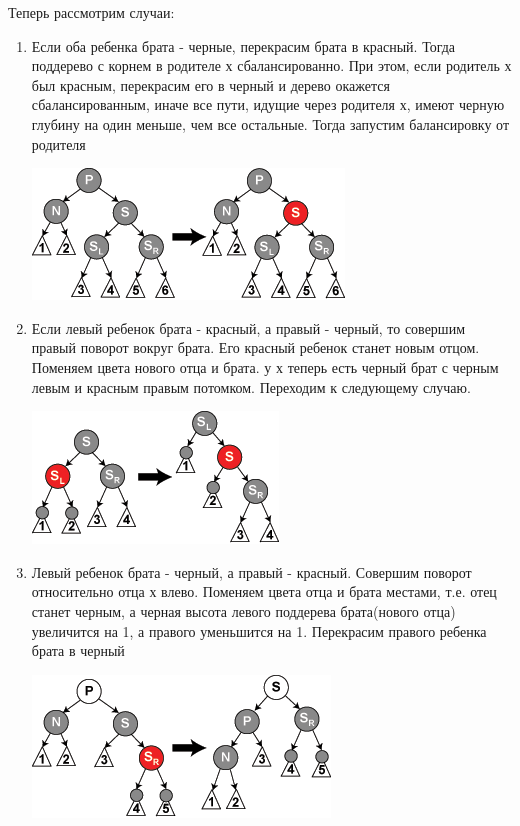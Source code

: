 \documentclass[a4paper,10pt]{article}
\begin{document}
Теперь рассмотрим случаи:
\begin{enumerate}
	\item Если оба ребенка брата - черные, перекрасим брата в красный. Тогда поддерево с корнем в родителе х сбалансированно. При этом, если родитель х был красным, перекрасим его в черный и дерево окажется сбалансированным, иначе все пути, идущие через родителя х, имеют черную глубину на один меньше, чем все остальные. Тогда запустим балансировку от родителя\\
\begin{center}\includegraphics{rbt_del_2.png}\end{center}
	\item Если левый ребенок брата - красный, а правый - черный, то совершим правый поворот вокруг брата. Его красный ребенок станет новым отцом. Поменяем цвета нового отца и брата. у х теперь есть черный брат с черным левым и красным правым потомком. Переходим к следующему случаю.\\
\begin{center}\includegraphics{rbt_del_4.png}\end{center}
	\item Левый ребенок брата - черный, а правый - красный. Совершим поворот относительно отца х влево. Поменяем цвета отца и брата местами, т.е. отец станет черным, а черная высота левого поддерева брата(нового отца) увеличится на 1, а правого уменьшится на 1. Перекрасим правого ребенка брата в черный\\
\begin{center}\includegraphics{rbt_del_5.png}\end{center}
\end{enumerate}
\end{document}
